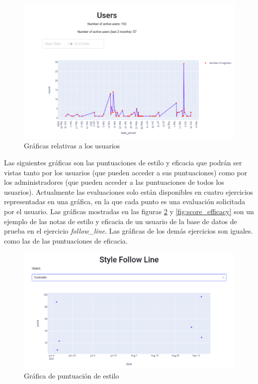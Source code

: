 \begin{figure}[H]
    \centering
    \includegraphics[width=17cm, keepaspectratio]{img/users.png}
    \caption{Gráficas relativas a los usuarios}
    \label{fig:users}
\end{figure}

\newpage
Las siguientes gráficas son las puntuaciones de estilo y eficacia que podrán ser vistas tanto por los usuarios (que pueden acceder a sus puntuaciones) como por los administradores (que pueden acceder a las puntuaciones de todos los usuarios).  Actualmente las evaluaciones solo están disponibles en cuatro ejercicios representadas en una gráfica, en la que cada punto es una evaluación solicitada por el usuario. Las gráficas mostradas en las figuras \ref{fig:score} y \ref{fig:score_efficacy}  son un ejemplo de las notas de estilo y eficacia de un usuario de la base de datos de prueba en el ejercicio \textit{follow\_line}. Las gráficas de los demás ejercicios son iguales. como las de las puntuaciones de eficacia.



\begin{figure}[H]
    \centering
    \includegraphics[width=17cm, keepaspectratio]{img/score.png}
    \caption{Gráfica de puntuación de estilo}
    \label{fig:score}
\end{figure}


